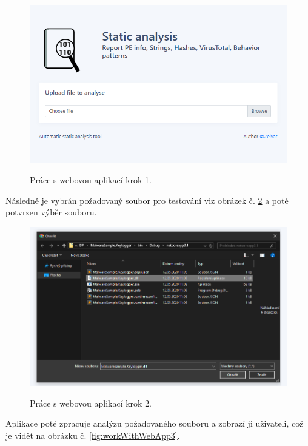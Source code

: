 \begin{figure}[H]
    \caption{Práce s webovou aplikací krok 1.}
    \centering
    \includegraphics[width=135mm,scale=0.5]{Figures/obrazky/web-krok1.png}
    \label{fig:workWithWebApp1}
\end{figure}

Následně je vybrán požadovaný soubor pro testování viz obrázek č. \ref{fig:workWithWebApp2} a poté potvrzen výběr souboru.

\begin{figure}[H]
    \caption{Práce s webovou aplikací krok 2.}
    \centering
    \includegraphics[width=135mm,scale=0.5]{Figures/obrazky/web-krok2.png}
    \label{fig:workWithWebApp2}
\end{figure}

Aplikace poté zpracuje analýzu požadovaného souboru a zobrazí ji uživateli, což je vidět na obrázku č. \ref{fig:workWithWebApp3}.

